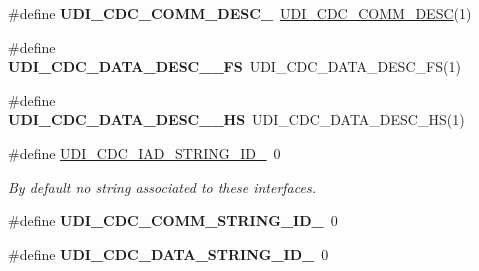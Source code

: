 \begin{DoxyCompactItemize}
\item 
\hypertarget{group__udi__cdc__group__desc_gaf0d114f42fedbab90dd693313e39feff}{\#define {\bfseries U\-D\-I\-\_\-\-C\-D\-C\-\_\-\-C\-O\-M\-M\-\_\-\-D\-E\-S\-C\-\_}~\hyperlink{group__udi__cdc__group__desc_gac76fc1207bccd36e9851945206c063c0}{U\-D\-I\-\_\-\-C\-D\-C\-\_\-\-C\-O\-M\-M\-\_\-\-D\-E\-S\-C}(1)}\label{group__udi__cdc__group__desc_gaf0d114f42fedbab90dd693313e39feff}

\item 
\hypertarget{group__udi__cdc__group__desc_ga8ef454edaac2e78dafa04d12639df4fc}{\#define {\bfseries U\-D\-I\-\_\-\-C\-D\-C\-\_\-\-D\-A\-T\-A\-\_\-\-D\-E\-S\-C\-\_\-\_\-\-F\-S}~U\-D\-I\-\_\-\-C\-D\-C\-\_\-\-D\-A\-T\-A\-\_\-\-D\-E\-S\-C\-\_\-\-F\-S(1)}\label{group__udi__cdc__group__desc_ga8ef454edaac2e78dafa04d12639df4fc}

\item 
\hypertarget{group__udi__cdc__group__desc_ga0896ac88162cb008eedd047218ab51fa}{\#define {\bfseries U\-D\-I\-\_\-\-C\-D\-C\-\_\-\-D\-A\-T\-A\-\_\-\-D\-E\-S\-C\-\_\-\_\-\-H\-S}~U\-D\-I\-\_\-\-C\-D\-C\-\_\-\-D\-A\-T\-A\-\_\-\-D\-E\-S\-C\-\_\-\-H\-S(1)}\label{group__udi__cdc__group__desc_ga0896ac88162cb008eedd047218ab51fa}

\item 
\hypertarget{group__udi__cdc__group__desc_gab61a0266ca195e98fd0448eab6d31e9a}{\#define \hyperlink{group__udi__cdc__group__desc_gab61a0266ca195e98fd0448eab6d31e9a}{U\-D\-I\-\_\-\-C\-D\-C\-\_\-\-I\-A\-D\-\_\-\-S\-T\-R\-I\-N\-G\-\_\-\-I\-D\-\_}~0}\label{group__udi__cdc__group__desc_gab61a0266ca195e98fd0448eab6d31e9a}

\begin{DoxyCompactList}\small\item\em By default no string associated to these interfaces. \end{DoxyCompactList}\item 
\hypertarget{group__udi__cdc__group__desc_ga4a124784759eb9ac9acdc83d2597fdff}{\#define {\bfseries U\-D\-I\-\_\-\-C\-D\-C\-\_\-\-C\-O\-M\-M\-\_\-\-S\-T\-R\-I\-N\-G\-\_\-\-I\-D\-\_}~0}\label{group__udi__cdc__group__desc_ga4a124784759eb9ac9acdc83d2597fdff}

\item 
\hypertarget{group__udi__cdc__group__desc_ga3d201dc7d46fbf4c798e4b1400b2c508}{\#define {\bfseries U\-D\-I\-\_\-\-C\-D\-C\-\_\-\-D\-A\-T\-A\-\_\-\-S\-T\-R\-I\-N\-G\-\_\-\-I\-D\-\_}~0}\label{group__udi__cdc__group__desc_ga3d201dc7d46fbf4c798e4b1400b2c508}


\end{DoxyCompactItemize}
